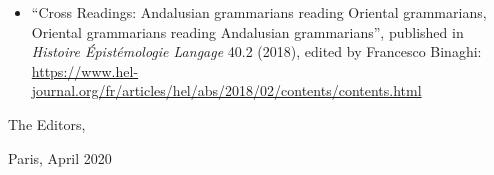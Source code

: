 \begin{refsection}
\begin{itemize}
    \item ``Cross Readings: Andalusian grammarians reading Oriental grammarians, Oriental grammarians reading Andalusian grammarians'', published in \emph{Histoire Épistémologie Langage} 40.2 (2018), edited by Francesco Binaghi: \url{https://www.hel-journal.org/fr/articles/hel/abs/2018/02/contents/contents.html}
\end{itemize}

\begin{flushright}
The Editors,

Paris, April 2020
\end{flushright}

{\sloppy\printbibliography[heading=subbibliography]}
\end{refsection}

